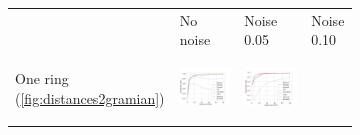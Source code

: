 \documentclass[twoside,11pt]{article}
\begin{document}

\begin{figure}
	\centering   
    \begin{subfigure}{\textwidth}
    \begin{footnotesize}
    \begin{tabu} to 
        &
        No noise &
        Noise 0.05 &
        Noise 0.10 \\
        
        \begin{sideways}
        	One ring (\cref{fig:distances2gramian})
        \end{sideways} &
		\includegraphics[width=\linewidth]{figures/geodesics/geodesics_circles_orthogonal_noise000_label0} &
		\includegraphics[width=\linewidth]{figures/geodesics/geodesics_circles_orthogonal_noise005_label0} &

\end{tabu}
\end{footnotesize}
\end{subfigure}
\end{figure}
\end{document}
